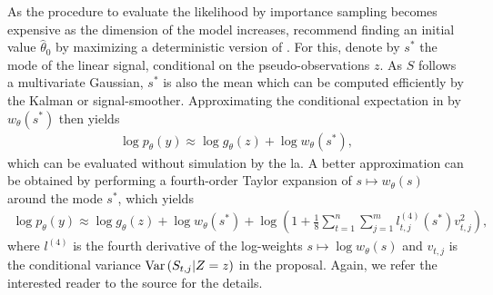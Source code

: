 As the procedure to evaluate the likelihood by importance sampling becomes expensive as the dimension of the model increases, \citep{Durbin1997Monte} recommend finding an initial value $\hat \theta_{0}$ by maximizing a deterministic version of . For this, denote by $s^{\ast}$ the mode of the linear signal, conditional on the pseudo-observations $z$. As $S$ follows a multivariate Gaussian, $s^{\ast}$ is also the mean which can be computed efficiently by the Kalman or signal-smoother. Approximating the conditional expectation in  by $w_{\theta}(s^{\ast})$ then yields 
\begin{align}
    \label{eq:loglik-initial-approx-mode}
    \log p_{\theta}(y) \approx \log g_{\theta}(z) + \log w_{\theta}(s^{\ast}),
\end{align}
which can be evaluated without simulation by the \acrshort{la}. A better approximation can be obtained by performing a fourth-order Taylor expansion of $s\mapsto w_{\theta}(s)$ around the mode $s^\ast$, which yields 
\begin{align}
    \label{eq:loglik-initial-tayolor-approx-mode}
    \log p_{\theta}(y) \approx \log g_{\theta}(z) + \log w_{\theta}(s^{\ast}) + \log \left( 1 + \frac{1}{8} \sum_{t = 1}^n\sum_{j = 1}^m l^{(4)}_{t,j}(s^{\ast}) v_{t,j}^2 \right),
\end{align}
where $l^{(4)}$ is the fourth derivative of the log-weights $s\mapsto \log w_{\theta}(s)$ and $v_{t,j}$ is the conditional variance $\operatorname{Var} \left( S_{t,j} | Z = z \right)$ in the proposal. Again, we refer the interested reader to the source for the details.

